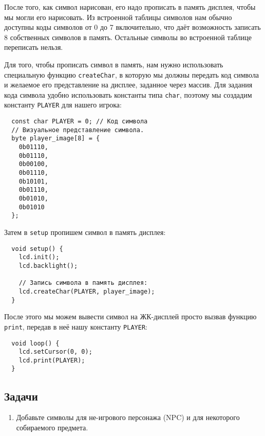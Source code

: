 \documentclass[../sparc.tex]{subfiles}
\begin{document}
После того, как символ нарисован, его надо прописать в память дисплея, чтобы мы
могли его нарисовать.  Из встроенной таблицы символов нам обычно доступны коды
символов от 0 до 7 включительно, что даёт возможность записать 8 собственных
символов в память.  Остальные символы во встроенной таблице переписать нельзя.

Для того, чтобы прописать символ в память, нам нужно использовать специальную
функцию \texttt{createChar}, в которую мы должны передать код символа и желаемое
его представление на дисплее, заданное через массив.  Для задания кода символа
удобно использовать константы типа \texttt{char}, поэтому мы создадим константу
\texttt{PLAYER} для нашего игрока:

\begin{verbatim}
  const char PLAYER = 0; // Код символа
  // Визуальное представление символа.
  byte player_image[8] = {
    0b01110,
    0b01110,
    0b00100,
    0b01110,
    0b10101,
    0b01110,
    0b01010,
    0b01010
  };
\end{verbatim}

Затем в \texttt{setup} пропишем символ в память дисплея:

\begin{verbatim}
  void setup() {
    lcd.init();
    lcd.backlight();

    // Запись символа в память дисплея:
    lcd.createChar(PLAYER, player_image);
  }
\end{verbatim}

После этого мы можем вывести символ на ЖК-дисплей просто вызвав функцию
\texttt{print}, передав в неё нашу константу \texttt{PLAYER}:

\begin{verbatim}
  void loop() {
    lcd.setCursor(0, 0);
    lcd.print(PLAYER);
  }
\end{verbatim}

\subsection{Задачи}
\begin{enumerate}
\item Добавьте символы для не-игрового персонажа (\gls{NPC}) и для некоторого
  собираемого предмета.
\end{enumerate}
\end{document}
